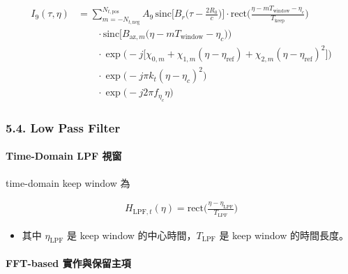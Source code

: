 \documentclass[11pt]{article}
\providecommand{\tightlist}{%
  \setlength{\itemsep}{0pt}\setlength{\parskip}{0pt}}
\begin{document}
\begin{equation}
\begin{aligned}
I_9(\tau,\eta)
&=
\sum_{m=-N_{t,\mathrm{neg}}}^{N_{t,\mathrm{pos}}} A_9\,
\mathrm{sinc}\biggl[ B_r\biggl( \tau-\frac{2R_0}{c} \biggr) \biggr]
\cdot \mathrm{rect}\biggl( \frac{\eta-mT_{\mathrm{window}}-\eta_c}{T_{\mathrm{keep}}} \biggr)\\
&\qquad \cdot \mathrm{sinc}\biggl[ B_{\mathrm{az},m}\biggl( \eta-mT_{\mathrm{window}}-\eta_c \biggr) \biggr)\\
&\qquad \cdot \exp\biggl( -j\biggl[ \chi_{0,m}+\chi_{1,m}(\eta-\eta_{\mathrm{ref}})
+\chi_{2,m}(\eta-\eta_{\mathrm{ref}})^2 \biggr] \biggr)\\
&\qquad \cdot \exp\biggl( -j\pi k_t(\eta-\eta_c)^2 \biggr)\\
&\qquad \cdot \exp\biggl( -j2\pi f_{\eta_c}\eta \biggr)
\end{aligned}
\end{equation}

\hypertarget{low-pass-filter-1}{%
\subsubsection{5.4. Low Pass Filter}\label{low-pass-filter-1}}

\hypertarget{time-domain-lpf-ux8996ux7a97}{%
\paragraph{Time-Domain LPF 視窗}\label{time-domain-lpf-ux8996ux7a97}}

time-domain keep window 為

\begin{equation}
\begin{aligned}
H_{\mathrm{LPF},t}(\eta) = \mathrm{rect}\biggl( \frac{\eta-\eta_{\mathrm{LPF}}}{T_{\mathrm{LPF}}} \biggr)
\end{aligned}
\end{equation}

\begin{itemize}
\tightlist
\item
  其中 \(\eta_{\mathrm{LPF}}\) 是 keep window
  的中心時間，\(T_{\mathrm{LPF}}\) 是 keep window 的時間長度。
\end{itemize}

\hypertarget{fft-based-ux5be6ux4f5cux8207ux4fddux7559ux4e3bux9805}{%
\paragraph{FFT-based
實作與保留主項}\label{fft-based-ux5be6ux4f5cux8207ux4fddux7559ux4e3bux9805}}
\end{document}
